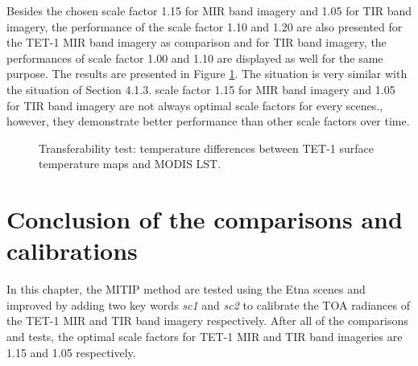 \noindent Besides the chosen scale factor 1.15 for MIR band imagery and 1.05 for TIR band imagery, the performance of the scale factor 1.10 and 1.20 are also presented for the TET-1 MIR band imagery as comparison and for TIR band imagery, the performances of scale factor 1.00 and 1.10 are displayed as well for the same purpose. The results are presented in Figure \ref{fig:LST_test}. The situation is very similar with the situation of Section 4.1.3. scale factor 1.15 for MIR band imagery and 1.05 for TIR band imagery are not always optimal scale factors for every scenes., however, they demonstrate better performance than other scale factors over time.\\

\begin{figure}[!htbp]
\centering
{}
\hspace{0.5in}
\caption{Transferability test: temperature differences between TET-1 surface temperature maps and MODIS LST.}
\label{fig:LST_test}
\end{figure}


\section{Conclusion of the comparisons and calibrations}
In this chapter, the MITIP method are tested using the Etna scenes and improved by adding two key words \emph{sc1} and \emph{sc2} to calibrate the TOA radiances of the TET-1 MIR and TIR band imagery respectively. After all of the comparisons and tests, the optimal scale factors for TET-1 MIR and TIR band imageries are 1.15 and 1.05 respectively.



